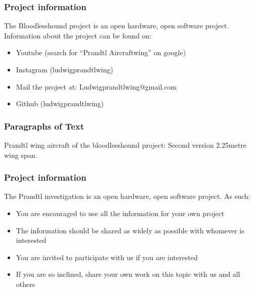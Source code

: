 \documentclass{beamer}
\begin{document}
\begin{frame}
\frametitle{Project information}

The Bloodlesshound project is an open hardware, open software project.  Information about the project can be found on:  

\begin{itemize}
\item Youtube (search for ``Prandtl Aircraftwing'' on google)
\item Instagram (ludwigprandtlwing)
\item Mail the project at: Ludwigprandtlwing@gmail.com 
\item Github (ludwigprandtlwing)
\end{itemize}

\end{frame}






\begin{frame}
\frametitle{Paragraphs of Text}
Prandtl wing aircraft of the bloodlesshound project:  Second version 2.25metre wing span.



\end{frame}


\begin{frame}
\frametitle{Project information}

The Prandtl investigation is an open hardware, open software project.  As such:  

\begin{itemize}
\item You are encouraged to use all the information for your own project
\item The information should be shared as widely as possible with whomever is interested
\item You are invited to participate with us if you are interested
\item If you are so inclined, share your own work on this topic with us and all others
\end{itemize}

\end{frame}


\end{document}
